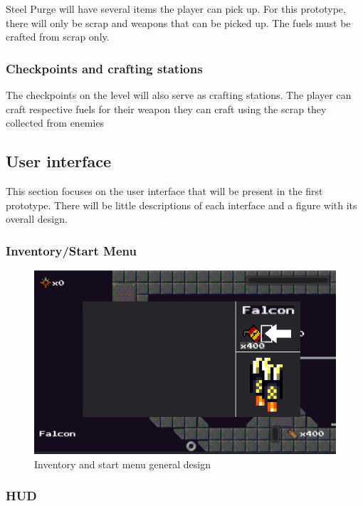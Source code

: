 \documentclass[../Main.tex]{subfiles}
\begin{document}
Steel Purge will have several items the player can pick up. For this prototype, there will only be scrap and weapons that can be picked up. The fuels must be crafted from scrap only.

\subsubsection{Checkpoints and crafting stations}

The checkpoints on the level will also serve as crafting stations. The player can craft respective fuels for their weapon they can craft using the scrap they collected from enemies

\subsection{User interface}

This section focuses on the user interface that will be present in the first prototype. There will be little descriptions of each interface and a figure with its overall design.

\subsubsection{Inventory/Start Menu}

\begin{figure}[H]
	\centering
	\includegraphics[width=\columnwidth]{Figures/InventoryUI.png}
	\caption{Inventory and start menu general design}
\end{figure}

\subsubsection{HUD}
\end{document}
